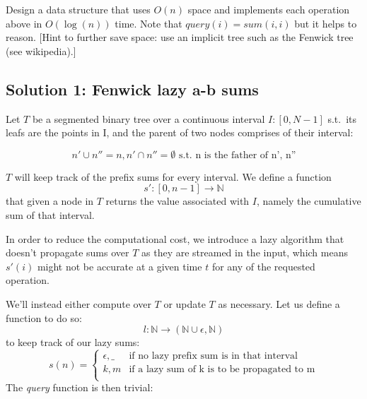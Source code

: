 \documentclass{article}
\begin{document}
Design a data structure that uses $O(n)$ space and implements each operation above
in $O(\log(n))$ time. Note that $query(i) = sum(i, i)$ but it helps to reason.
[Hint to further save space: use an implicit tree such as the Fenwick tree (see wikipedia).]

\subsection{Solution 1: Fenwick lazy a-b sums}
Let $T$ be a segmented binary tree over a continuous interval $I: [0, N - 1]$
s.t.\ its leafs are the points in I, and the parent of two nodes comprises of their interval:

    \begin{equation*}
    n' \cup n'' = n, n' \cap n'' = \emptyset   \textrm{ s.t. n is the father of n', n''}
    \end{equation*}

$T$ will keep track of the prefix sums for every interval.
We define a function
    \begin{equation}
    s': [0, n - 1] \to \mathbb{N}
    \end{equation}
that given a node in $T$ returns the value associated with $I$, namely the
cumulative sum of that interval.

In order to reduce the computational cost, we introduce a lazy algorithm
that doesn't propagate sums over $T$ as they are streamed in the input,
which means $s'(i)$ might not be accurate at a given time $t$ for any of the
requested operation.

We'll instead either compute over $T$ or update $T$ as necessary.
Let us define a function to do so:
    \begin{equation}
    l: \mathbb{N} \to (\mathbb{N} \cup {\epsilon}, \mathbb{N})
    \end{equation}
to keep track of our lazy sums:
    \begin{equation*}
    s(n) = \begin{cases}
            \epsilon, \_            &   \textrm{if no lazy prefix sum is in that interval} \\
            k, m                    &   \textrm{if a lazy sum of k is to be propagated to m}\\
            \end{cases}
        \end{equation*}
The \emph{query} function is then trivial:
\end{document}
